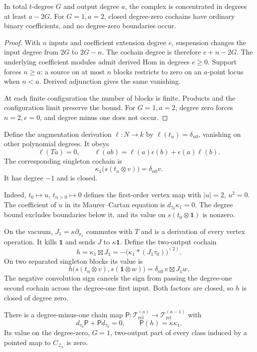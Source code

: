 \begin{lemma}
\label{v4-arith:centers:lem:loop-degree}
In total $t$-degree $G$ and output degree $a$, the complex
is concentrated in degrees at least $a-2G$.
For $G=1,a=2$, closed degree-zero cochains have ordinary
binary coefficients, and no degree-zero boundaries occur.
\end{lemma}

\begin{proof}
With $n$ inputs and coefficient extension degree $e$,
suspension changes the input degree from $2G$ to $2G-n$.
The cochain degree is therefore $e+n-2G$.
The underlying coefficient modules admit derived Hom in
degrees $e\geq0$. Support forces $n\geq a$: a source on
at most $n$ blocks restricts to zero on an $a$-point locus
when $n<a$. Derived adjunction gives the same vanishing.

At each finite configuration the number of blocks is finite.
Products and the configuration limit preserve the bound.
For $G=1,a=2$, degree zero forces $n=2,e=0$, and degree
minus one does not occur.
\end{proof}

Define the augmentation derivation
$\ell:N\to k$ by $\ell(t_n)=\delta_{n0}$, vanishing on
other polynomial degrees. It obeys
\[
 \ell(Ta)=0,\qquad
 \ell(ab)=\ell(a)\epsilon(b)+\epsilon(a)\ell(b).
\]
The corresponding singleton cochain is
\[
 \kappa_1\bigl(s(t_n\otimes v)\bigr)=\delta_{n0}v.
\]
It has degree $-1$ and is closed.

Indeed, $t_0\mapsto u$, $t_{n>0}\mapsto0$ defines the
first-order vertex map with $|u|=2$, $u^2=0$.
The coefficient of $u$ in its Maurer--Cartan equation is
$d_{\tau_0}\kappa_1=0$.
The degree bound excludes boundaries below it, and its
value on $s(t_0\otimes\mathbf1)$ is nonzero.

On the vacuum, $J_1=\kappa\partial_{x_1}$ commutes with $T$
and is a derivation of every vertex operation.
It kills $\mathbf1$ and sends $J$ to $\kappa\mathbf1$.
Define the two-output cochain
\[
 h=\kappa_1\boxtimes J_1
   =-\bigl(\kappa_1\ast(J_1\tau_0)\bigr)^{(2)}.
\]
On two separated singleton blocks its value is
\[
 h\bigl(s(t_n\otimes v),s(\mathbf1\otimes w)\bigr)
 =\delta_{n0}\,v\boxtimes J_1w.
\]
The negative convolution sign cancels the sign from passing
the degree-one second cochain across the degree-one first
input. Both factors are closed, so $h$ is closed of degree zero.

\begin{lemma}
\label{v4-arith:centers:lem:vacuum-probe}
There is a degree-minus-one chain map
$\mathsf P:\mathcal T_{\mathrm{rel}}^{(a)}
\to\mathcal T_{\mathrm{rel}}^{(a-1)}$ with
\[
 d_{\tau_0}\mathsf P+\mathsf P d_{\tau_0}=0,\qquad
 \mathsf P(h)=\kappa\kappa_1.
\]
Its value on the degree-zero, $G=1$, two-output part of
every class induced by a pointed map to
$C_{\mathcal Z_\kappa}$ is zero.
\end{lemma}

